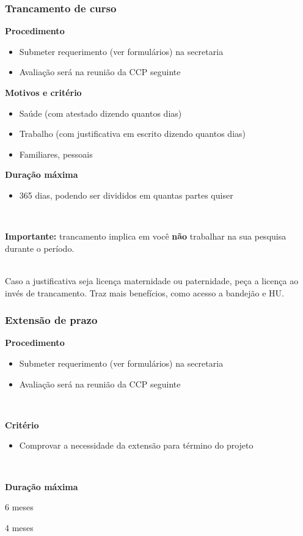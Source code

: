 \documentclass{beamer}
\begin{document}
\begin{frame}
  \frametitle{Trancamento de curso}

  \textbf{Procedimento}
  \begin{itemize}
    \item Submeter requerimento (ver formulários) na secretaria
    \item Avaliação será na reunião da CCP seguinte
  \end{itemize}\pause

  \textbf{Motivos e critério}
  \begin{itemize}
    \item Saúde (com atestado dizendo quantos dias)
    \item Trabalho (com justificativa em escrito dizendo quantos dias)
    \item Familiares, pessoais
  \end{itemize}\pause

  \textbf{Duração máxima}
  \begin{itemize}
    \item 365 dias, podendo ser divididos em quantas partes quiser
  \end{itemize}~\\\pause

  \textbf{Importante:} trancamento implica em você \textbf{não} trabalhar na sua pesquisa durante
  o período.\\~\\\pause

  Caso a justificativa seja licença maternidade ou paternidade, peça a licença ao invés de
  trancamento. Traz mais benefícios, como acesso a bandejão e HU.
\end{frame}

\begin{frame}
  \frametitle{Extensão de prazo}

  \textbf{Procedimento}
  \begin{itemize}
    \item Submeter requerimento (ver formulários) na secretaria
    \item Avaliação será na reunião da CCP seguinte
  \end{itemize}~\\\pause

  \textbf{Critério}
  \begin{itemize}
    \item Comprovar a necessidade da extensão para término do projeto
  \end{itemize}~\\\pause

  \textbf{Duração máxima}
  \begin{description}[Doutorado]
    \item[Mestrado:] 6 meses
    \item[Doutorado:] 4 meses
  \end{description}
\end{frame}
\end{document}
